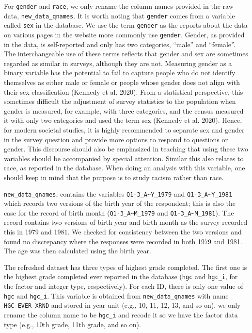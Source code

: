 \documentclass{article}
\begin{document}
For \texttt{gender} and \texttt{race}, we only rename the column names provided in the raw data, \texttt{new\_data\_qnames}. It is worth noting that \texttt{gender} comes from a variable called \texttt{sex} in the database. We use the term \texttt{gender} as the reports about the data on various pages in the website more commonly use \texttt{gender}. Gender, as provided in the data, is self-reported and only has two categories, ``male'' and ``female''. The interchangeable use of these terms reflects that gender and sex are sometimes regarded as similar in surveys, although they are not. Measuring gender as a binary variable has the potential to fail to capture people who do not identify themselves as either male or female or people whose gender does not align with their sex classification (Kennedy et al. 2020). From a statistical perspective, this sometimes difficult the adjustment of survey statistics to the population when gender is measured, for example, with three categories, and the census measured it with only two categories and used the term sex (Kennedy et al. 2020). Hence, for modern societal studies, it is highly recommended to separate sex and gender in the survey question and provide more options to respond to questions on gender. This discourse should also be emphasized in teaching that using these two variables should be accompanied by special attention. Similar this also relates to race, as reported in the database. When doing an analysis with this variable, one should keep in mind that the purpose is to study racism rather than race.

\texttt{new\_data\_qnames}, contains the variables \texttt{Q1-3\_A\textasciitilde{}Y\_1979} and \texttt{Q1-3\_A\textasciitilde{}Y\_1981} which records two versions of the birth year of the respondent; this is also the case for the record of birth month (\texttt{Q1-3\_A\textasciitilde{}M\_1979} and \texttt{Q1-3\_A\textasciitilde{}M\_1981}). The record contains two versions of birth year and birth month as the survey recorded this in 1979 and 1981. We checked for consistency between the two versions and found no discrepancy where the responses were recorded in both 1979 and 1981. The age was then calculated using the birth year.

The refreshed dataset has three types of highest grade completed. The first one is the highest grade completed ever reported in the database (\texttt{hgc} and \texttt{hgc\_i}, for the factor and integer type, respectively). For each ID, there is only one value of \texttt{hgc} and \texttt{hgc\_i}. This variable is obtained from \texttt{new\_data\_qnames} with name \texttt{HGC\_EVER\_XRND} and stored in year unit (e.g., 10, 11, 12, 13, and so on), we only rename the column name to be \texttt{hgc\_i} and recode it so we have the factor data type (e.g., 10th grade, 11th grade, and so on).
\end{document}
